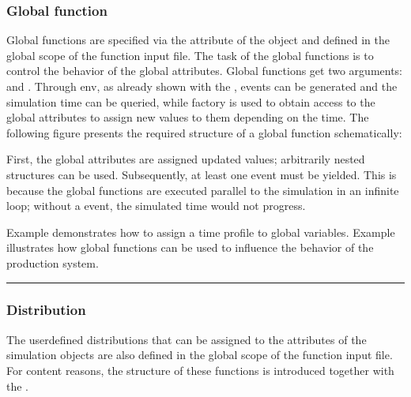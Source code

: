 \documentclass[letterpaper,10pt,english]{sphinxmanual}
\begin{document}
\subsubsection{Global function}
\label{\detokenize{source/Interface_files/function_file:global-function}}\label{\detokenize{source/Interface_files/function_file:id2}}
\sphinxAtStartPar
Global functions are specified via the  attribute of the  object and defined in the global scope of
the function input file. The task of the global functions is to control the behavior of the global attributes. Global
functions get two arguments:  and . Through env, as already shown with the
{\hyperref[\detokenize{source/Interface_files/function_file:process-function}]{}},  events can be generated and the simulation time can be queried,
while factory is used to obtain access to the global attributes to assign new values to them depending on the time. The
following figure presents the required structure of a global function schematically:


\sphinxAtStartPar
First, the global attributes are assigned updated values; arbitrarily nested structures can be used. Subsequently, at
least one  event must be yielded. This is because the global functions are executed parallel to the simulation in
an infinite loop; without a  event, the simulated time would not progress.

\sphinxAtStartPar
Example {\hyperref[\detokenize{source/Examples/example02:id1}]{}} demonstrates how to assign a time profile to global variables. Example {\hyperref[\detokenize{source/Examples/example03:id1}]{}} illustrates
how global functions can be used to influence the behavior of the production system.


\bigskip\hrule\bigskip



\subsubsection{Distribution}
\label{\detokenize{source/Interface_files/function_file:distribution}}\label{\detokenize{source/Interface_files/function_file:id3}}
\sphinxAtStartPar
The user\sphinxhyphen{}defined distributions that can be assigned to the attributes of the simulation objects are also defined in the
global scope of the function input file. For content reasons, the structure of these functions is introduced together
with the  {\hyperref[\detokenize{source/Interface_files/attribute_values:user-defined}]{}}.
\end{document}
